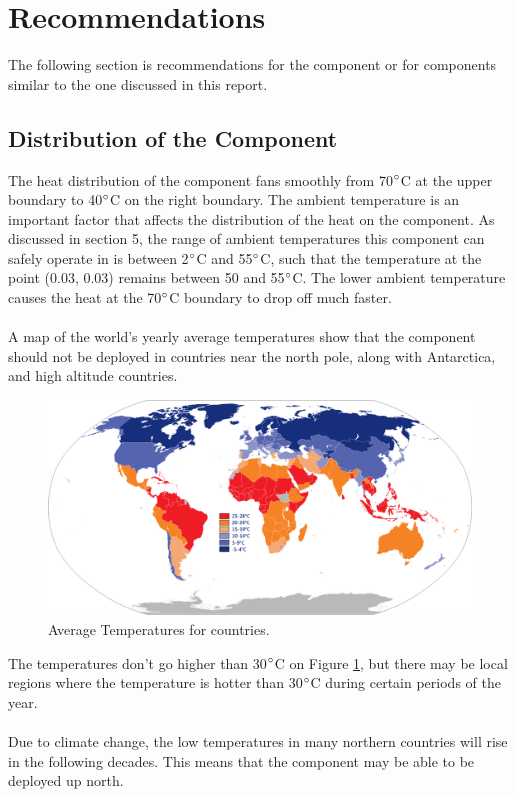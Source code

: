 \documentclass[12pt,a4paper]{article}
\begin{document}
\section{Recommendations}
The following section is recommendations for the component or for components similar to the one discussed in this report.
\subsection{Distribution of the Component}
The heat distribution of the component fans smoothly from 70$\degree$C at the upper boundary to 40$\degree$C on the right boundary. The ambient temperature is an important factor that affects the distribution of the heat on the component. As discussed in section 5, the range of ambient temperatures this component can safely operate
in is between 2$\degree$C and 55$\degree$C, such that the temperature at the point (0.03, 0.03) remains between 50 and 55$\degree$C. The lower ambient temperature causes the heat at the 70$\degree$C boundary to drop off much faster. 
\\\\
A map of the world's yearly average temperatures show that the component should not be deployed in countries near the north pole, along with Antarctica, and high altitude countries. 
\begin{figure}[H]
	\center
	\includegraphics[width=0.9\linewidth]{images/Average_yearly_temperature_per_country.png}
	\caption{Average Temperatures for countries.}
	\label{fig:worldtemperature}
\end{figure}
The temperatures don't go higher than 30$\degree$C on Figure \ref{fig:worldtemperature}, but there may be local regions where the temperature is hotter than 30$\degree$C during certain periods of the year.
\\\\
Due to climate change, the low temperatures in many northern countries will rise in the following decades. This means that the component may be able to be deployed up north. 
\end{document}
